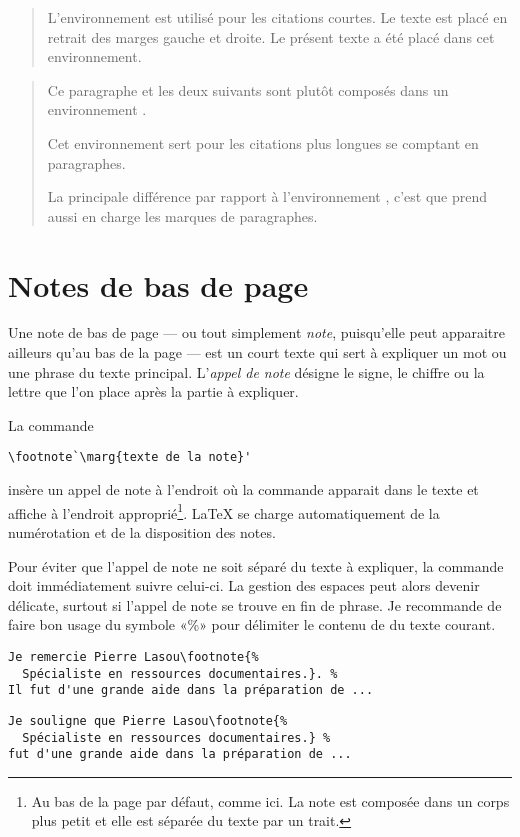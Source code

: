 \begin{quote}
  L'environnement  est utilisé pour les citations courtes.
  Le texte est placé en retrait des marges gauche et droite. Le
  présent texte a été placé dans cet environnement.
\end{quote}

\begin{quotation}
  Ce paragraphe et les deux suivants sont plutôt composés dans
  un environnement .

  Cet environnement sert pour les citations plus longues se comptant
  en paragraphes.

  La principale différence par rapport à l'environnement ,
  c'est que  prend aussi en charge les marques de
  paragraphes.
\end{quotation}


\section{Notes de bas de page}
\label{sec:apparence:notes}

Une note de bas de page --- ou tout simplement \emph{note},
puisqu'elle peut apparaitre ailleurs qu'au bas de la page --- est un
court texte qui sert à expliquer un mot ou une phrase du texte
principal. L'\emph{appel de note} désigne le signe, le chiffre ou la
lettre que l'on place après la partie à expliquer.

La commande
\begin{lstlisting}
\footnote`\marg{texte de la note}'
\end{lstlisting}
insère un appel de note à l'endroit où la commande apparait dans le
texte et affiche  à l'endroit
approprié\footnote{%
  Au bas de la page par défaut, comme ici. La note est composée dans
  un corps plus petit et elle est séparée du texte par un trait.}. %
{\LaTeX} se charge automatiquement de la numérotation et de la
disposition des notes.

Pour éviter que l'appel de note ne soit séparé du texte à expliquer,
la commande \cmd{\footnote} doit immédiatement suivre celui-ci. La
gestion des espaces peut alors devenir délicate, surtout si l'appel de
note se trouve en fin de phrase. Je recommande de faire bon usage
du symbole «\%» pour délimiter le contenu de \cmdprint{\footnote} du
texte courant.
\begin{lstlisting}[emph=footnote]
%% note en fin de phrase
Je remercie Pierre Lasou\footnote{%
  Spécialiste en ressources documentaires.}. %
Il fut d'une grande aide dans la préparation de ...
\end{lstlisting}
\begin{lstlisting}[emph=footnote]
%% note au fil de la phrase
Je souligne que Pierre Lasou\footnote{%
  Spécialiste en ressources documentaires.} %
fut d'une grande aide dans la préparation de ...
\end{lstlisting}

